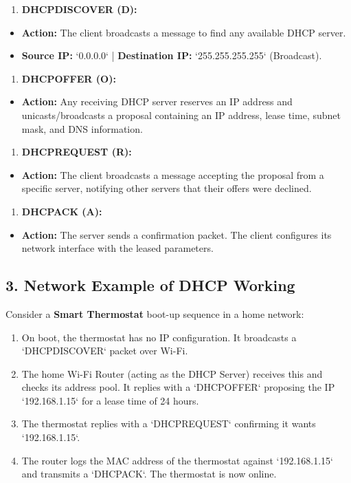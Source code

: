 \begin{enumerate}
  \item \textbf{DHCPDISCOVER (D):}
\end{enumerate}
\begin{itemize}
  \item   \textbf{Action:} The client broadcasts a message to find any available DHCP server.
  \item   \textbf{Source IP:} `0.0.0.0` | \textbf{Destination IP:} `255.255.255.255` (Broadcast).
\end{itemize}
\begin{enumerate}
  \item \textbf{DHCPOFFER (O):}
\end{enumerate}
\begin{itemize}
  \item   \textbf{Action:} Any receiving DHCP server reserves an IP address and unicasts/broadcasts a proposal containing an IP address, lease time, subnet mask, and DNS information.
\end{itemize}
\begin{enumerate}
  \item \textbf{DHCPREQUEST (R):}
\end{enumerate}
\begin{itemize}
  \item   \textbf{Action:} The client broadcasts a message accepting the proposal from a specific server, notifying other servers that their offers were declined.
\end{itemize}
\begin{enumerate}
  \item \textbf{DHCPACK (A):}
\end{enumerate}
\begin{itemize}
  \item   \textbf{Action:} The server sends a confirmation packet. The client configures its network interface with the leased parameters.
\end{itemize}


\subsection{3. Network Example of DHCP Working}
Consider a \textbf{Smart Thermostat} boot-up sequence in a home network:
\begin{enumerate}
  \item On boot, the thermostat has no IP configuration. It broadcasts a `DHCPDISCOVER` packet over Wi-Fi.
  \item The home Wi-Fi Router (acting as the DHCP Server) receives this and checks its address pool. It replies with a `DHCPOFFER` proposing the IP `192.168.1.15` for a lease time of 24 hours.
  \item The thermostat replies with a `DHCPREQUEST` confirming it wants `192.168.1.15`.
  \item The router logs the MAC address of the thermostat against `192.168.1.15` and transmits a `DHCPACK`. The thermostat is now online.
\end{enumerate}



